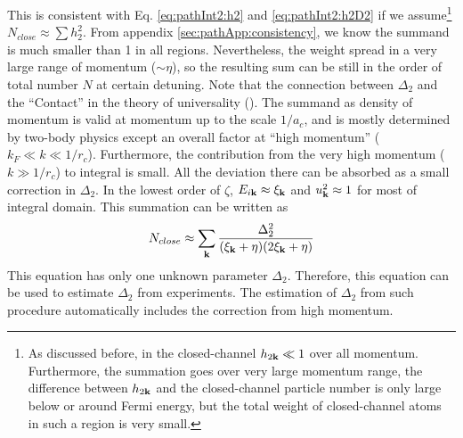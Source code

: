 This is consistent with Eq. \ref{eq:pathInt2:h2} and \ref{eq:pathInt2:h2D2} if we assume\footnote{As discussed before, in the closed-channel $h_{2\mathbf{k}}\ll1$ over all momentum.  Furthermore, the summation goes over very large momentum range, the difference between $h_{2\mathbf{k}}$ and the closed-channel particle number is only large below or around Fermi energy, but the total weight of closed-channel atoms  in such a region is very small.  }  $N_{close}\approx\sum{h_{2}^{2}}$.    From appendix \ref{sec:pathApp:consistency}, we know the summand is much smaller than 1 in all regions.  Nevertheless, the weight spread in a very large range of momentum ($\sim\eta$), so the resulting sum can be still in the order of total number $N$ at certain detuning. Note that the connection between $\Delta_{2}$ and the ``Contact'' in the theory of universality (\cite{Tan2008-1,Tan2008-2}).  The summand as  density of momentum is valid at momentum up to the scale $1/a_{c}$, and is mostly determined by two-body physics except an overall factor at ``high momentum'' ($k_{F}\ll{}k\ll{}1/r_{c}$).  Furthermore, the contribution from the very high momentum ($k\gg1/r_{c}$) to integral is small.  All the deviation there can be absorbed as a small correction in $\Delta_{2}$.  In the lowest order of $\zeta$, $E_{i\mathbf{k}}\approx\xi_{\mathbf{k}}$ and $u_{\mathbf{k}}^2\approx1$ for most of integral domain.  This summation can be written as 
\begin{equation}\label{eq:pathInt2:closeD2}
N_{close}\approx\sum_{\mathbf{k}}\frac{\Delta_{2}^2}{(\xi_{\mathbf{k}}+\eta)(2\xi_{\mathbf{k}}+\eta)}
\end{equation}
This equation has only one unknown parameter $\Delta_{2}$.  Therefore, this equation can be used to estimate $\Delta_{2}$ from experiments.  The  estimation of  $\Delta_{2}$ from such procedure automatically includes the correction from  high momentum. 


